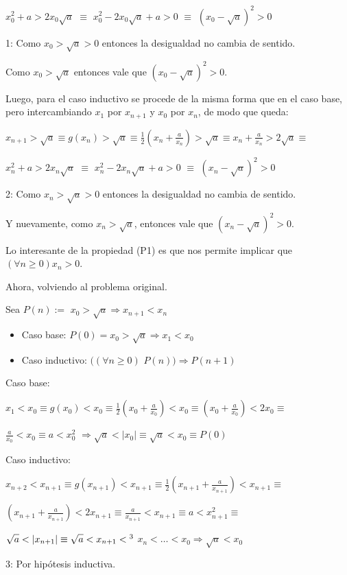 \hspace{4cm}$\displaystyle  x_{0}^2+ a > 2x_{0}\sqrt{a}$ \footnotemark[1] $\equiv$	$x_{0}^2 - 2x_{0}\sqrt{a} + a > 0$ $\equiv$ $\left(x_{0} - \sqrt{a}\right)^2 > 0$

1: Como $x_0 > \sqrt{a} > 0$ entonces la desigualdad no cambia de sentido.

Como $x_0 > \sqrt{a}$ entonces vale que $\left(x_{0} - \sqrt{a}\right)^2 > 0$.

Luego, para el caso inductivo se procede de la misma forma que en el caso base, pero intercambiando $x_1$ por $x_{n+1}$ y $x_0$ por $x_n$, de modo que queda:

\hspace{4cm}$\displaystyle  x_{n+1} > \sqrt{a} \equiv g(x_n) > \sqrt{a} \equiv \frac{1}{2}\left(x_n+ \frac{a}{x_n}\right) > \sqrt{a} \equiv x_n+ \frac{a}{x_n} > 2\sqrt{a}\equiv$


\hspace{4cm}$\displaystyle  x_{n}^2+ a > 2x_{n}\sqrt{a}$ \footnotemark[2] $\equiv$	$x_{n}^2 - 2x_{n}\sqrt{a} + a > 0$ $\equiv$ $\left(x_{n} - \sqrt{a}\right)^2 > 0$


2: Como $x_n > \sqrt{a} > 0$ entonces la desigualdad no cambia de sentido.

Y nuevamente, como $x_n > \sqrt{a}$, entonces vale que $\left(x_{n} - \sqrt{a}\right)^2 > 0$.

Lo interesante de la propiedad (P1) es que nos permite implicar que $(\forall n \geq 0) x_n > 0$.

Ahora, volviendo al problema original.

Sea $P(n):=$ $x_0 > \sqrt{a} \Rightarrow x_{n+1} < x_{n}$
\begin{itemize}
	\item Caso base: $P(0) = x_0 > \sqrt{a} \Rightarrow x_1 < x_0$
	\item Caso inductivo: $((\forall n\geq 0)$ $P(n)) \Rightarrow P(n+1)$
\end{itemize}

Caso base:


\hspace{4cm}$\displaystyle x_1 < x_0 \equiv g(x_0) < x_0 \equiv \frac{1}{2}\left(x_0 + \frac{a}{x_0}\right) < x_0 \equiv \left(x_0 + \frac{a}{x_0}\right) < 2x_0 \equiv$


\hspace{4.5cm}$\displaystyle \frac{a}{x_0} < x_0 \equiv a < x_{0}^2$ $\Rightarrow \sqrt{a} < |x_0| \equiv \sqrt{a} < x_0 \equiv P(0)$

Caso inductivo:
 
\hspace{4cm}$\displaystyle  x_{n+2} < x_{n+1} \equiv g(x_{n+1}) < x_{n+1} \equiv \frac{1}{2}\left(x_{n+1} + \frac{a}{x_{n+1}}\right) < x_{n+1} \equiv $


\hspace{4cm}$\displaystyle  \left(x_{n+1} + \frac{a}{x_{n+1}}\right) < 2x_{n+1} \equiv \frac{a}{x_{n+1}} < x_{n+1} \equiv a < x_{n+1}^2 \equiv $


\hspace{4cm}$\displaystyle  \sqrt{a} < |x_{n+1}| \equiv \sqrt{a} < x_{n+1} <\footnotemark[3]$  $x_n < \ldots < x_0 \Rightarrow \sqrt{a} < x_0$


3: Por hip\'otesis inductiva.
